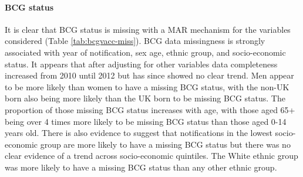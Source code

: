\documentclass[11pt,twoside]{bristolthesis}
\begin{document}
  \hypertarget{bcg-status}{%
  \paragraph{BCG status}\label{bcg-status}}
  
  It is clear that BCG status is missing with a MAR mechanism for the variables considered (Table \ref{tab:bcgvacc-miss}). BCG data missingness is strongly associated with year of notification, sex age, ethnic group, and socio-economic status. It appears that after adjusting for other variables data completeness increased from 2010 until 2012 but has since showed no clear trend. Men appear to be more likely than women to have a missing BCG status, with the non-UK born also being more likely than the UK born to be missing BCG status. The proportion of those missing BCG status increases with age, with those aged 65+ being over 4 times more likely to be missing BCG status than those aged 0-14 years old. There is also evidence to suggest that notifications in the lowest socio-economic group are more likely to have a missing BCG status but there was no clear evidence of a trend across socio-economic quintiles. The White ethnic group was more likely to have a missing BCG status than any other ethnic group.
  
\end{document}
